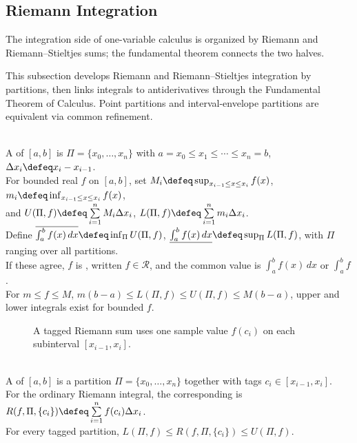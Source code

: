 \subsection{Riemann Integration}

The integration side of one-variable calculus is organized by Riemann and Riemann--Stieltjes sums; the fundamental theorem connects the two halves.

This subsection develops Riemann and Riemann--Stieltjes integration by partitions, then links integrals to antiderivatives through the Fundamental Theorem of Calculus. Point partitions and interval-envelope partitions are equivalent via common refinement.

\begin{definition} \label{def:partition-and-riemann-upper-lower-sums}\label{def:riemann-stieltjes-core-source-todo} \\
A  of $[a,b]$ is $\Pi=\{x_0,\ldots,x_n\}$ with $a=x_0\leq x_1\leq\cdots\leq x_n=b$, $\Delta x_i\defeq x_i-x_{i-1}$.\\
For bounded real $f$ on $[a,b]$, set $M_i\defeq\sup_{x_{i-1}\leq x\leq x_i}f(x)$, $m_i\defeq\inf_{x_{i-1}\leq x\leq x_i}f(x)$,\\
and $U(\Pi,f)\defeq\sum\limits_{i=1}^{n}M_i\Delta x_i$, $L(\Pi,f)\defeq\sum\limits_{i=1}^{n}m_i\Delta x_i$.\\
Define $\overline{\int_a^b f(x)\,dx}\defeq\inf_\Pi U(\Pi,f)$, $\underline{\int_a^b f(x)\,dx}\defeq\sup_\Pi L(\Pi,f)$, with $\Pi$ ranging over all partitions.\\
If these agree, $f$ is , written $f\in\mathcal{R}$, and the common value is $\int_a^b f(x)\,dx$ or $\int_a^b f$.\\
For $m\leq f\leq M$, $m(b-a)\leq L(\Pi,f)\leq U(\Pi,f)\leq M(b-a)$, upper and lower integrals exist for bounded $f$.
\end{definition}

\begin{figure}[H]
  \centering
  
  \caption{A tagged Riemann sum uses one sample value $f(c_i)$ on each subinterval $[x_{i-1},x_i]$.}
  \label{fig:riemann-tagged-sum}
\end{figure}

\begin{definition} \label{def:tagged-partitions-and-riemann-sums} \\
A  of $[a,b]$ is a partition $\Pi=\{x_0,\ldots,x_n\}$ together with tags $c_i\in[x_{i-1},x_i]$.\\
For the ordinary Riemann integral, the corresponding  is $R(f,\Pi,\{c_i\})\defeq\sum\limits_{i=1}^{n}f(c_i)\Delta x_i$.\\
For every tagged partition, $L(\Pi,f)\leq R(f,\Pi,\{c_i\})\leq U(\Pi,f)$.
\end{definition}


